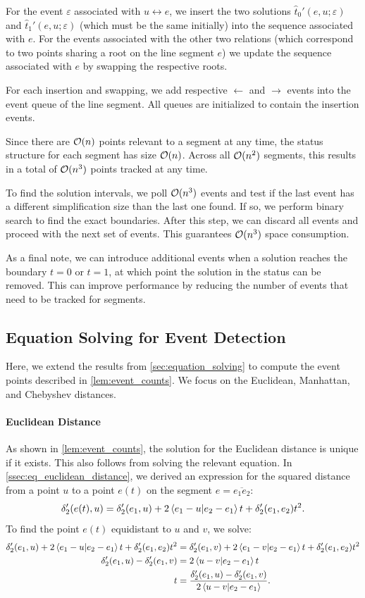 For the event \(\varepsilon\) associated with \(u \leftrightarrow e\), we insert the two solutions \(\hat t_0'(e, u; \varepsilon)\) and \(\hat t_1'(e, u; \varepsilon)\) (which must be the same initially) into the sequence associated with \(e\). For the events associated with the other two relations (which correspond to two points sharing a root on the line segment \(e\)) we update the sequence associated with \(e\) by swapping the respective roots. 

For each insertion and swapping, we add respective \(\leftarrow\) and \(\rightarrow\) events into the event queue of the line segment. All queues are initialized to contain the insertion events.

Since there are \(\mathcal{O}(n)\) points relevant to a segment at any time, the status structure for each segment has size \(\mathcal{O}(n)\). Across all \(\mathcal{O}(n^2)\) segments, this results in a total of \(\mathcal{O}(n^3)\) points tracked at any time. 

To find the solution intervals, we poll \(\mathcal{O}(n^3)\) events and test if the last event has a different simplification size than the last one found. If so, we perform binary search to find the exact boundaries. After this step, we can discard all events and proceed with the next set of events. This guarantees \(\mathcal{O}(n^3)\) space consumption.

As a final note, we can introduce additional events when a solution reaches the boundary \(t=0\) or \(t=1\), at which point the solution in the status can be removed. This can improve performance by reducing the number of events that need to be tracked for segments. 

\subsection{Equation Solving for Event Detection}\label{ssec:equations-solving-2}
Here, we extend the results from \cref{sec:equation_solving} to compute the event points described in \cref{lem:event_counts}. We focus on the Euclidean, Manhattan, and Chebyshev distances.

\paragraph{Euclidean Distance}
As shown in \cref{lem:event_counts}, the solution for the Euclidean distance is unique if it exists. This also follows from solving the relevant equation. In \cref{ssec:eq_euclidean_distance}, we derived an expression for the squared distance from a point \(u\) to a point \(e(t)\) on the segment \(e = \overline{e_1e_2}\):
	\[\delta_2'(e(t), u) = \delta_2'(e_1, u) + 2\braket{e_1 - u | e_2 - e_1}t + \delta_2'(e_1, e_2)t^2.\]
To find the point \(e(t)\) equidistant to \(u\) and \(v\), we solve:
\begin{align*}
	\delta_2'(e_1, u) + 2\braket{e_1 - u | e_2 - e_1}t + \delta_2'(e_1, e_2)t^2 &= \delta_2'(e_1, v) + 2\braket{e_1 - v | e_2 - e_1}t + \delta_2'(e_1, e_2)t^2\\
	\delta_2'(e_1, u) - \delta_2'(e_1, v) &=  2\braket{u - v | e_2 - e_1}t \\
	t &= \frac{\delta_2'(e_1, u) - \delta_2'(e_1, v)}{2\braket{u - v | e_2 - e_1}}.
\end{align*}

